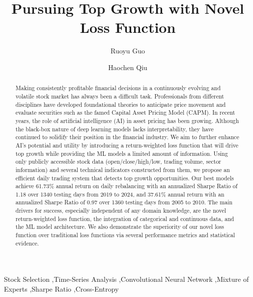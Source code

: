 \documentclass[preprint,12pt,numafflabel,authoryear]{elsarticle}
\begin{document}
\begin{frontmatter}

\title{Pursuing Top Growth with Novel Loss Function}

\author[label1]{Ruoyu Guo}
\author[label2]{Haochen Qiu}

\begin{abstract}
Making consistently profitable financial decisions in a continuously evolving and volatile stock market has always been a difficult task. Professionals from different disciplines have developed foundational theories to anticipate price movement and evaluate securities such as the famed Capital Asset Pricing Model (CAPM). In recent years, the role of artificial intelligence (AI) in asset pricing has been growing. Although the black-box nature of deep learning models lacks interpretability, they have continued to solidify their position in the financial industry. We aim to further enhance AI's potential and utility by introducing a return-weighted loss function that will drive top growth while providing the ML models a limited amount of information. Using only publicly accessible stock data (open/close/high/low, trading volume, sector information) and several technical indicators constructed from them, we propose an efficient daily trading system that detects top growth opportunities. Our best models achieve 61.73\% annual return on daily rebalancing with an annualized Sharpe Ratio of 1.18 over 1340 testing days from 2019 to 2024, and 37.61\% annual return with an annualized Sharpe Ratio of 0.97 over 1360 testing days from 2005 to 2010. The main drivers for success, especially independent of any domain knowledge, are the novel return-weighted loss function, the integration of categorical and continuous data, and the ML model architecture. We also demonstrate the superiority of our novel loss function over traditional loss functions via several performance metrics and statistical evidence.
\end{abstract}

\begin{keyword}
Stock Selection \sep Time-Series Analysis \sep Convolutional Neural Network \sep Mixture of Experts \sep Sharpe Ratio \sep Cross-Entropy

\end{keyword}

\end{frontmatter}
\end{document}
